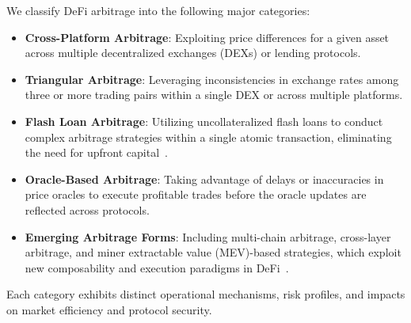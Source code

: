 \documentclass[conference]{IEEEtran}
\begin{document}
We classify DeFi arbitrage into the following major categories:
\begin{itemize}
    \item \textbf{Cross-Platform Arbitrage}: Exploiting price differences for a given asset across multiple decentralized exchanges (DEXs) or lending protocols.
    \item \textbf{Triangular Arbitrage}: Leveraging inconsistencies in exchange rates among three or more trading pairs within a single DEX or across multiple platforms.
    \item \textbf{Flash Loan Arbitrage}: Utilizing uncollateralized flash loans to conduct complex arbitrage strategies within a single atomic transaction, eliminating the need for upfront capital~\cite{qin2021attacking}.
    \item \textbf{Oracle-Based Arbitrage}: Taking advantage of delays or inaccuracies in price oracles to execute profitable trades before the oracle updates are reflected across protocols.
    \item \textbf{Emerging Arbitrage Forms}: Including multi-chain arbitrage, cross-layer arbitrage, and miner extractable value (MEV)-based strategies, which exploit new composability and execution paradigms in DeFi~\cite{qin2022quantifying}.
\end{itemize}
Each category exhibits distinct operational mechanisms, risk profiles, and impacts on market efficiency and protocol security.
\end{document}
